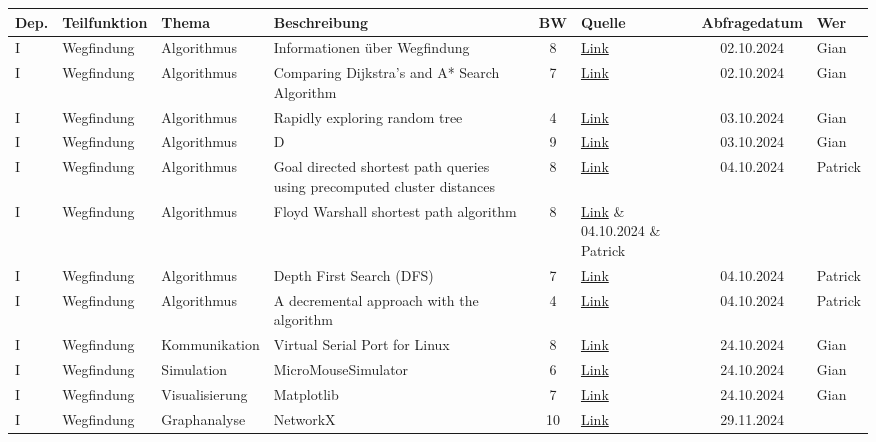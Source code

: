 \documentclass[../main.tex]{subfiles}
\begin{document}
\scriptsize
\begin{longtable}{lp{2cm}p{2cm}p{4cm}clcl}
\textbf{Dep.} & \textbf{Teilfunktion} & \textbf{Thema} &
\textbf{Beschreibung} & \textbf{BW} & \textbf{Quelle} & \textbf{Abfragedatum} &
\textbf{Wer}\tabularnewline
\endhead

I & Wegfindung & Algorithmus & Informationen über Wegfindung & 8 &
\href{https://de.wikipedia.org/wiki/Pathfinding}{Link} & 02.10.2024 & Gian
\tabularnewline
I & Wegfindung & Algorithmus & Comparing Dijkstra’s and A* Search Algorithm & 7 &
\href{https://medium.com/@miguell.m/dijkstras-and-a-search-algorithm-2e67029d7749}{Link}
& 02.10.2024 & Gian
\tabularnewline
I & Wegfindung & Algorithmus & Rapidly exploring random tree & 4 &
\href{https://en.wikipedia.org/wiki/Rapidly_exploring_random_tree}{Link}
& 03.10.2024 & Gian
\tabularnewline
I & Wegfindung & Algorithmus & D\* & 9 &
\href{https://en.wikipedia.org/wiki/D*}{Link} & 03.10.2024 & Gian
\tabularnewline
I & Wegfindung & Algorithmus & Goal directed shortest path queries using precomputed cluster distances & 8 &
\href{https://publikationen.bibliothek.kit.edu/1000009512}{Link} & 04.10.2024 & Patrick
\tabularnewline
I & Wegfindung & Algorithmus & Floyd Warshall shortest path algorithm & 8 &
\href{https://en.wikipedia.org/wiki/Floyd%E2%80%93Warshall_algorithm}{Link} & 04.10.2024 & Patrick
\tabularnewline
I & Wegfindung & Algorithmus & Depth First Search (DFS) & 7 &
\href{https://en.wikipedia.org/wiki/Depth-first_search}{Link} & 04.10.2024 & Patrick
\tabularnewline
I & Wegfindung & Algorithmus & A decremental approach with the \* algorithm & 4 &
\href{https://doi.org/10.1016/j.measurement.2014.10.014}{Link} & 04.10.2024 & Patrick
\tabularnewline
I & Wegfindung & Kommunikation & Virtual Serial Port for Linux & 8 &
\href{https://stackoverflow.com/questions/52187/virtual-serial-port-for-linux}{Link} & 24.10.2024 & Gian
\tabularnewline
I & Wegfindung & Simulation & MicroMouseSimulator & 6 &
\href{https://github.com/mackorone/mms}{Link} & 24.10.2024 & Gian
\tabularnewline
I & Wegfindung & Visualisierung & Matplotlib & 7 &
\href{https://matplotlib.org/}{Link} & 24.10.2024 & Gian
\tabularnewline
I & Wegfindung & Graphanalyse & NetworkX & 10 &
\href{https://wiki.python.org/moin/PythonGraphLibraries}{Link} & 29.11.2024
\tabularnewline


\end{longtable}
\end{document}
